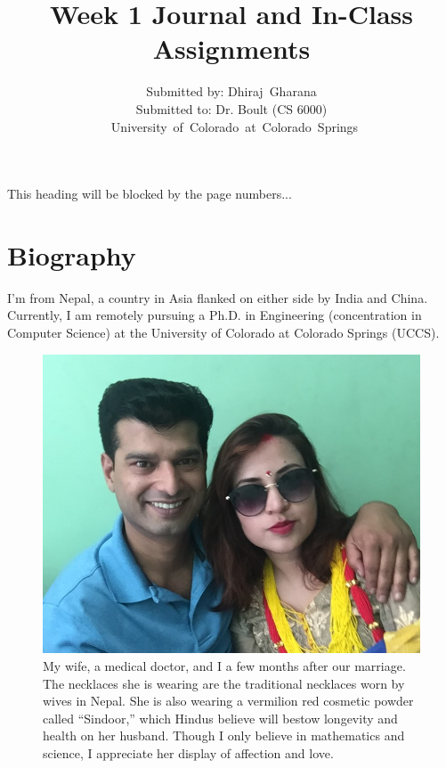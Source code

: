 \documentclass[journal]{IEEEtran}
\begin{document}
	\title{Week 1 Journal and In-Class Assignments}
	
	\author{{\LARGE Submitted by: Dhiraj~Gharana}\\{\large Submitted to: Dr. Boult (CS 6000)}\\ {\normalsize ~University~of~Colorado~at~Colorado~Springs}}
	
	{This heading will be blocked by the page numbers...}
	
	\maketitle
	
\section{Biography}
\label{sec:biography}
	
\noindent I'm from Nepal, a country in Asia flanked on either side by India and China. Currently, I am remotely pursuing a Ph.D. in Engineering (concentration in Computer Science) at the University of Colorado at Colorado Springs (UCCS).    	   
	
\begin{figure}
	\begin{center}
		\includegraphics[width=0.9\linewidth]{images/fig1}
	\end{center}		
	\caption*{\footnotesize My wife, a medical doctor, and I a few months after our marriage. The necklaces she is wearing are the traditional necklaces worn by wives in Nepal. She is also wearing a vermilion red cosmetic powder called ``Sindoor,'' which Hindus believe will bestow longevity and health on her husband. Though I only believe in mathematics and science, I appreciate her display of affection and love.}		
\end{figure}  
\end{document}
